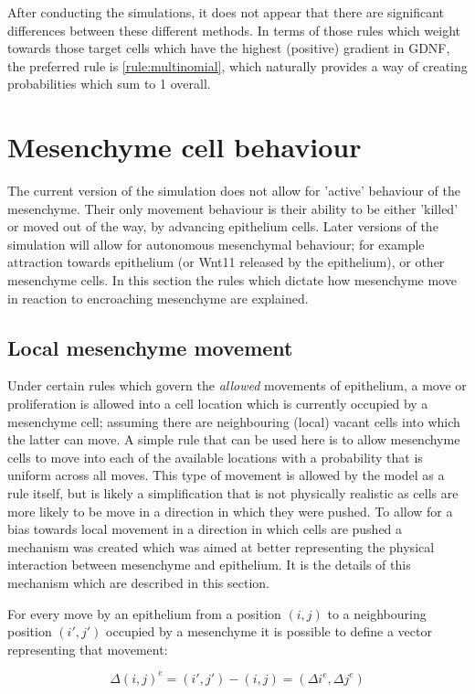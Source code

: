 \documentclass[pdftex,10pt,a4paper]{article}
\begin{document}
After conducting the simulations, it does not appear that there are significant differences between these different methods. In terms of those rules which weight towards those target cells which have the highest (positive) gradient in 
GDNF, the preferred rule is \ref{rule:multinomial}, which naturally provides a way of creating probabilities which sum to 1 overall.


\section{Mesenchyme cell behaviour}
The current version of the simulation does not allow for 'active' behaviour of the mesenchyme. Their only movement behaviour is their ability to be either 'killed' or moved out of the way, by advancing epithelium cells. Later versions of the simulation will allow for autonomous mesenchymal behaviour; for example attraction towards epithelium (or Wnt11 released by the epithelium), or other mesenchyme cells. In this section the rules which dictate how mesenchyme move in reaction to encroaching mesenchyme are explained.

\subsection{Local mesenchyme movement}\label{sec:weighted}
Under certain rules which govern the \textit{allowed} movements of epithelium, a move or proliferation is allowed into a cell location which is currently occupied by a mesenchyme cell; assuming there are neighbouring (local) vacant cells into which the latter can move. A simple rule that can be used here is to allow mesenchyme cells to move into each of the available locations with a probability that is uniform across all moves. This type of movement is allowed by the model as a rule itself, but is likely a simplification that is not physically realistic as cells are more likely to be move in a direction in which they were pushed. To allow for a bias towards local movement in a direction in which cells are pushed a mechanism was created which was aimed at better representing the physical interaction between mesenchyme and epithelium. It is the details of this mechanism which are described in this section.

For every move by an epithelium from a position $(i,j)$ to a neighbouring position $(i',j')$ occupied by a mesenchyme it is possible to define a vector representing that movement:

\begin{equation}\label{eq:delta_move}
\Delta(i,j)^{e} = (i',j') - (i,j) = (\Delta i^{e}, \Delta j^{e})
\end{equation}
\end{document}
